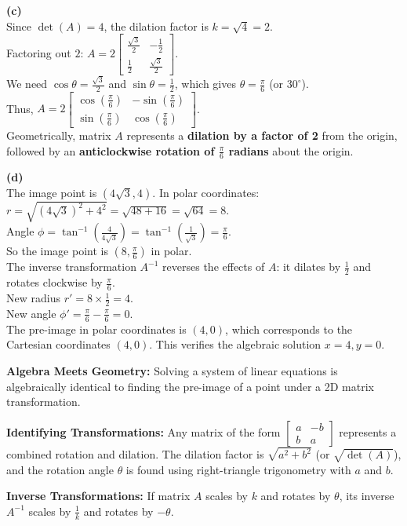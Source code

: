 \begin{solution}
\medskip
\textbf{(c)} \\
Since $\det(A) = 4$, the dilation factor is $k = \sqrt{4} = 2$. \\
Factoring out $2$: 
$A = 2 \begin{bmatrix} \frac{\sqrt{3}}{2} & -\frac{1}{2} \\ \frac{1}{2} & \frac{\sqrt{3}}{2} \end{bmatrix}$. \\
We need $\cos\theta = \frac{\sqrt{3}}{2}$ and $\sin\theta = \frac{1}{2}$, which gives $\theta = \frac{\pi}{6}$ (or $30^\circ$). \\
Thus, $A = 2 \begin{bmatrix} \cos(\frac{\pi}{6}) & -\sin(\frac{\pi}{6}) \\ \sin(\frac{\pi}{6}) & \cos(\frac{\pi}{6}) \end{bmatrix}$. \\
Geometrically, matrix $A$ represents a \textbf{dilation by a factor of 2} from the origin, followed by an \textbf{anticlockwise rotation of $\frac{\pi}{6}$ radians} about the origin.

\medskip
\textbf{(d)} \\
The image point is $(4\sqrt{3}, 4)$. In polar coordinates: \\
$r = \sqrt{(4\sqrt{3})^2 + 4^2} = \sqrt{48 + 16} = \sqrt{64} = 8$. \\
Angle $\phi = \tan^{-1}\left(\frac{4}{4\sqrt{3}}\right) = \tan^{-1}\left(\frac{1}{\sqrt{3}}\right) = \frac{\pi}{6}$. \\
So the image point is $(8, \frac{\pi}{6})$ in polar. \\
The inverse transformation $A^{-1}$ reverses the effects of $A$: it dilates by $\frac{1}{2}$ and rotates clockwise by $\frac{\pi}{6}$. \\
New radius $r' = 8 \times \frac{1}{2} = 4$. \\
New angle $\phi' = \frac{\pi}{6} - \frac{\pi}{6} = 0$. \\
The pre-image in polar coordinates is $(4, 0)$, which corresponds to the Cartesian coordinates $(4, 0)$. This verifies the algebraic solution $x=4, y=0$.
\end{solution}

\begin{takeaways}
\item \textbf{Algebra Meets Geometry:} Solving a system of linear equations is algebraically identical to finding the pre-image of a point under a 2D matrix transformation.
\item \textbf{Identifying Transformations:} Any matrix of the form $\begin{bmatrix} a & -b \\ b & a \end{bmatrix}$ represents a combined rotation and dilation. The dilation factor is $\sqrt{a^2 + b^2}$ (or $\sqrt{\det(A)}$), and the rotation angle $\theta$ is found using right-triangle trigonometry with $a$ and $b$.
\item \textbf{Inverse Transformations:} If matrix $A$ scales by $k$ and rotates by $\theta$, its inverse $A^{-1}$ scales by $\frac{1}{k}$ and rotates by $-\theta$.
\end{takeaways}


